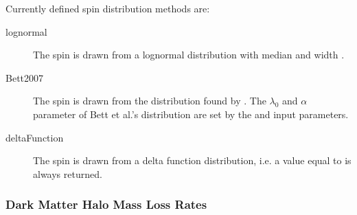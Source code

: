 Currently defined spin distribution methods are:
\begin{description}
 \item [{\normalfont \ttfamily lognormal}] The spin is drawn from a lognormal distribution with median {\normalfont \ttfamily [lognormalSpinDistributionMedian]} and width {\normalfont \ttfamily [lognormalSpinDistributionSigma]}.
 \item [{\normalfont \ttfamily Bett2007}] The spin is drawn from the distribution found by \cite{bett_spin_2007}. The $\lambda_0$ and $\alpha$ parameter of Bett et al.'s distribution are set by the {\normalfont {}} and {\normalfont {}} input parameters.
 \item [{\normalfont \ttfamily deltaFunction}] The spin is drawn from a delta function distribution, i.e. a value equal to {\normalfont \ttfamily [deltaFunctionSpinDistributionSpin]} is always returned.
\end{description}

\subsubsection{Dark Matter Halo Mass Loss Rates}\label{sec:HaloMassLossRates}

